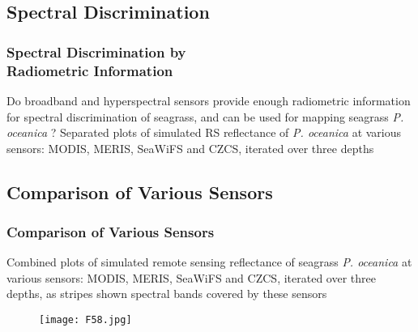\documentclass[pdflatex,compress,9pt,
	xcolor={dvipsnames,dvipsnames,svgnames,x11names,table},
	hyperref={colorlinks = true,breaklinks = true, urlcolor = NavyBlue, breaklinks = true}]{beamer}
\begin{document}
\subsection{Spectral Discrimination}
\begin{frame}\frametitle{Spectral Discrimination by \\Radiometric Information}
\scriptsize{Do broadband and hyperspectral sensors provide enough radiometric information for spectral discrimination of seagrass, and can be used for mapping seagrass \emph{P. oceanica} ? Separated plots of simulated \ac{RS} reflectance of \emph{P. oceanica} at various sensors: \ac{MODIS}, \ac{MERIS}, \ac{SeaWiFS} and \ac{CZCS}, iterated over three depths}
\begin{figure}[H]
	\centering
			\hspace{1mm}
\end{figure}
\begin{figure}[H]
	\centering
			\hspace{1mm}
\end{figure}
\end{frame}

\subsection{Comparison of Various Sensors}
\begin{frame}\frametitle{Comparison of Various Sensors}
\scriptsize{Combined plots of simulated remote sensing reflectance of seagrass \emph{P. oceanica} at various sensors: \ac{MODIS}, \ac{MERIS}, \ac{SeaWiFS} and \ac{CZCS}, iterated over three depths, as stripes shown spectral bands covered by these sensors}
\begin{figure}[H]
	\centering
		\texttt{[image: F58.jpg]}
\end{figure}
\end{frame}
\end{document}
